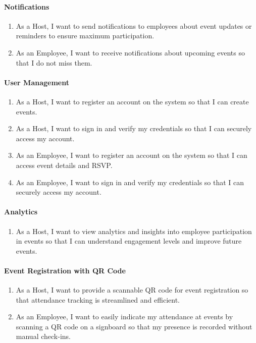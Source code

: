 \documentclass[a4paper,12pt]{article}
\begin{document}
\paragraph{Notifications}

\begin{enumerate}
    \item As a Host, I want to send notifications to employees about event updates or reminders to ensure maximum participation.
    \item As an Employee, I want to receive notifications about upcoming events so that I do not miss them.
\end{enumerate}

\paragraph{User Management}

\begin{enumerate}
    \item As a Host, I want to register an account on the system so that I can create events.
    \item As a Host, I want to sign in and verify my credentials so that I can securely access my account.
    \item As an Employee, I want to register an account on the system so that I can access event details and RSVP.
    \item As an Employee, I want to sign in and verify my credentials so that I can securely access my account.
\end{enumerate}

\paragraph{Analytics}

\begin{enumerate}
    \item As a Host, I want to view analytics and insights into employee participation in events so that 
    I can understand engagement levels and improve future events.
\end{enumerate}

\paragraph{Event Registration with QR Code}

\begin{enumerate}
    \item As a Host, I want to provide a scannable QR code for event registration so that attendance 
    tracking is streamlined and efficient.
    \item As an Employee, I want to easily indicate my attendance at events by scanning a QR code on 
    a signboard so that my presence is recorded without manual check-ins.
\end{enumerate}
\end{document}
